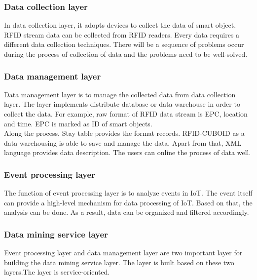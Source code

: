 \documentclass[a4paper,12pt]{article}
\begin{document}
{\subsubsection{Data collection layer}
In data collection layer, it adopts devices to collect the data of smart object. RFID stream data can be collected from RFID readers. Every data requires a different data collection techniques. There will be a sequence of problems occur during the process of collection of data and the  problems need to be well-solved. 
\subsubsection{Data management layer}
Data management layer is to manage the collected data from data collection layer. The layer implements distribute database or data warehouse in order to collect the data. For example, raw format of RFID data stream is EPC, location and time. EPC is marked as ID of smart objects.\\
\indent
Along the process, Stay table provides the format records. RFID-CUBOID as a data warehousing is able to save and manage the data. Apart from that, XML language provides data description. The users can online the process of data well.
\subsubsection{Event processing layer}
The function of event processing layer is to analyze events in IoT. The event itself can provide a high-level mechanism for data processing of IoT. Based on that, the analysis can be done. As a result, data can be organized and filtered accordingly. 
\subsubsection{Data mining service layer} 
Event processing layer and data management layer are two important layer for building the data mining service layer. The layer is built based on these two layers.The layer is service-oriented.
}
\end{document}
